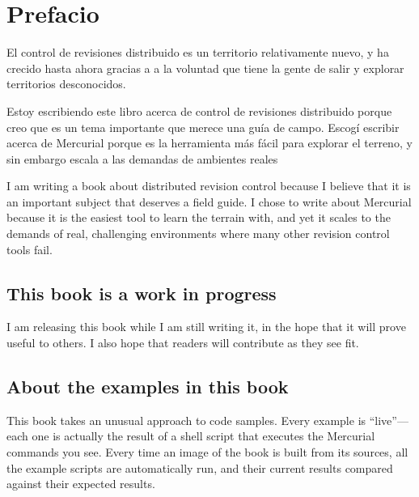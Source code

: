 \chapter*{Prefacio}
\label{chap:preface}

El control de revisiones distribuido es un territorio relativamente 
nuevo, y ha crecido hasta ahora 
gracias a  a la voluntad que tiene la gente de salir y explorar
territorios desconocidos.

Estoy escribiendo este libro acerca de control de revisiones
distribuido porque creo que es un tema importante que merece una guía
de campo. Escogí escribir acerca de Mercurial porque es la herramienta
más fácil para explorar el terreno, y sin embargo escala a las
demandas de ambientes reales

I am writing a book about distributed revision control because I
believe that it is an important subject that deserves a field guide.
I chose to write about Mercurial because it is the easiest tool to
learn the terrain with, and yet it scales to the demands of real,
challenging environments where many other revision control tools fail.

\section{This book is a work in progress}

I am releasing this book while I am still writing it, in the hope that
it will prove useful to others.  I also hope that readers will
contribute as they see fit.

\section{About the examples in this book}

This book takes an unusual approach to code samples.  Every example is
``live''---each one is actually the result of a shell script that
executes the Mercurial commands you see.  Every time an image of the
book is built from its sources, all the example scripts are
automatically run, and their current results compared against their
expected results.

